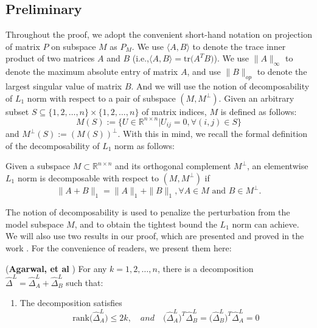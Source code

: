 \documentclass[AMS,STIX1COL]{WileyNJD-v2}
\begin{document}
{\subsection{Preliminary} \label{App:Pre}
Throughout the proof, we adopt the convenient short-hand notation on projection of matrix $P$ on subspace $M$ as $P_{M}$.
We use $\langle A,B \rangle$ to denote the trace inner product of two matrices $A$ and $B$ \big(i.e.,$\langle A,B \rangle=\mbox{tr}\big(A^T B\big)$\big).
We use $\|A\|_{\infty}$ to denote the maximum absolute entry of matrix $A$, and use $\|B\|_{op}$ to denote the largest singular value of matrix $B$.
And we will use the notion of decomposability of $L_1$ norm with respect to a pair of subspace $(M,M^{\perp})$.
Given an arbitrary subset $S \subseteq \{1,2,\dots,n\} \times \{1,2,\dots,n\}$ of matrix indices, $M$ is defined as follows:
\[
    M(S):=\{ U \in \mathbb{R}^{n \times n} | U_{ij}=0, \forall (i,j) \in S \}
\]
and $M^{\perp}(S):=(M(S))^{\perp}$.
With this in mind, we recall the formal definition of the decomposability of $L_1$ norm as follows:
\begin{definition}
    Given a subspace $M \subset \mathbb{R}^{n \times n}$ and its orthogonal complement $M^{\perp}$, an elementwise $L_1$ norm
    is decomposable with respect to $(M, M^{\perp})$ if
    \[
        \| A + B \|_{1} = \|A\|_{1} + \|B\|_{1},
        \forall A \in M \mbox{ and } B \in M^{\perp}.
    \]
\end{definition}
The notion of decomposability is used to penalize the perturbation from the model subspace $M$, and to obtain the tightest bound the $L_1$ norm can achieve.
We will also use two results in our proof, which are presented and proved in the work \cite{agarwal2012noisy}.
For the convenience of readers, we present them here:
\begin{lemma} \label{eq:Lmag}
(\textbf{Agarwal, et al} \cite{agarwal2012noisy})
For any $k=1,2,\dots,n$, there is a decomposition $\widehat{\Delta}^{L} =\widehat{\Delta}^{L}_{A} + \widehat{\Delta}^{L}_{B}$ such that:
\begin{enumerate}
 \item The decomposition satisfies
    \begin{equation}\label{eq:Lm1}
        \mbox{rank}\big(\widehat{\Delta}^{L}_{A}\big) \leq 2k, \quad and \quad \big(\widehat{\Delta}^{L}_{A}\big)^{T}\widehat{\Delta}^{L}_{B}
        = \big(\widehat{\Delta}^{L}_{B}\big)^{T}\widehat{\Delta}^{L}_{A} =0

\end{equation}
\end{enumerate}
\end{lemma}}
\end{document}
